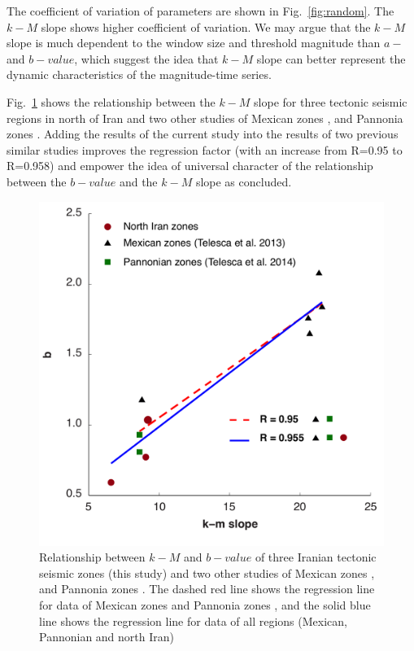  \noindent
The coefficient of variation of parameters are shown in Fig.~\ref{fig:random}. The $k-M$ slope shows higher coefficient of variation. We may argue that the $k-M$ slope is much dependent to the window size and threshold magnitude than $a-$ and $b-value$, which suggest the idea that $k-M$ slope can better represent the dynamic characteristics of the magnitude-time series. 
 
 

 
 \noindent
 Fig.~\ref{fig:regression} shows the relationship between the $k-M$ slope for three tectonic seismic regions in north of Iran and two other studies of Mexican zones \citep{Telesca2013}, and Pannonia zones \citep{Telesca2014}. Adding the results of the current study into the results of two previous similar studies improves the regression factor (with an increase from R=0.95 to R=0.958) and empower the idea of universal character of the relationship between the $b-value$ and the $k-M$ slope as \citet{Telesca2014} concluded. 

\begin{figure} [ht]
\centering
\includegraphics[scale=0.3]{figures/pdf/Figure07.pdf} 
\caption{ Relationship between $k-M$ and $b-value$ of three Iranian tectonic seismic zones (this study) and two other studies of Mexican zones \citep{Telesca2013}, and Pannonia zones \citep{Telesca2014}. The dashed red line shows the regression line for data of  Mexican zones and Pannonia zones \citep{Telesca2014}, and the solid blue line shows the regression line for data of all regions (Mexican, Pannonian and north Iran)}
\label{fig:regression}
\end{figure}


